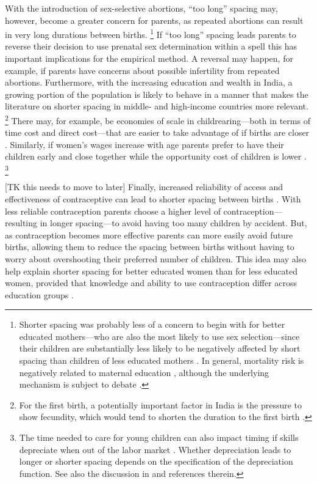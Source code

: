 \documentclass[12pt,letterpaper]{article}
\begin{document}
With the introduction of sex-selective abortions, ``too long'' spacing 
may, however, become a greater concern for parents, as 
repeated abortions can result in very long durations between births.%
\footnote{
Shorter spacing was probably less of a concern to begin with for
better educated mothers---who are also the most likely to use 
sex selection---since their children are substantially less likely 
to be negatively affected by short spacing than children of less 
educated mothers \citep{Whitworth2002}.
In general, mortality risk is negatively related to maternal
education \citep[for India, see, for example,][]{Tulasidhar1993},
although the underlying mechanism is subject
to debate \citep{Kovsted2002}.
}
If ``too long'' spacing leads parents to reverse their decision to use
prenatal sex determination within a spell this has important implications 
for the empirical method.
A reversal may happen, for example, if parents have concerns about possible 
infertility from repeated abortions.
Furthermore, with the increasing education and wealth in India, a growing 
portion of the population is likely to behave in a manner that makes the 
literature on shorter spacing in middle- and high-income countries more relevant.%
\footnote{
For the first birth, a potentially important factor in India is 
the pressure to show fecundity, which would tend to shorten
the duration to the first birth \citep{dyson83,Sethuraman2007,Dommaraju2009}.
}
There may, for example, be economies of scale in childrearing---both
in terms of time cost and direct cost---that are easier to
take advantage of if births are closer \citep[p 947]{Newman1984}.
Similarly, if women's wages increase with age parents prefer
to have their children early and close together while 
the opportunity cost of children is lower \citep{Heckman1976}.%
\footnote{
The time needed to care for young children can also impact 
timing if skills depreciate when out of the labor market \citep{Happel1984}.
Whether depreciation leads to longer or shorter spacing depends
on the specification of the depreciation function.
See also the discussion in \citet[p 315]{Hotz1997}
and references therein.
}

[TK this needs to move to later]
Finally, increased reliability of access and effectiveness of
contraceptive can lead to shorter spacing between births 
\citep{Keyfitz1971,Heckman1976}.
With less reliable contraception parents choose a higher level of 
contraception---resulting in longer spacing---to avoid having 
too many children by accident.
But, as contraception becomes more effective parents can more
easily avoid future births, allowing them to reduce the spacing 
between births without having to worry about overshooting their 
preferred number of children.
This idea may also help explain shorter spacing for better 
educated women than for less educated women, provided that   
knowledge and ability to use contraception differ
across education groups \citep{Tulasidhar1993,Whitworth2002}.
\end{document}
